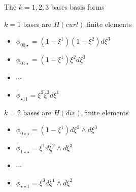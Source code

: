 \documentclass[aspectratio=169]{beamer}
\begin{document}
\begin{frame}[fragile]{The $k = 1, 2, 3$ bases basis forms}

\begin{block}{$k = 1$ bases are $H(curl)$ finite elements}
\begin{itemize}
\item $\phi_{00\star} = (1-\xi^1)(1-\xi^2) d\xi^3$
\item $\phi_{01\star} = (1-\xi^1) \xi^2 d\xi^3$
\item $\cdots$
\item $\phi_{\star11} = \xi^2 \xi^3 d\xi^1$
\end{itemize} 
 \end{block}
\begin{block}{$k = 2$ bases are $H(div)$ finite elements}
\begin{itemize}
\item $\phi_{0\star\star} = (1-\xi^1) d\xi^2 \wedge d\xi^3$
\item $\phi_{1\star\star} = \xi^1 d\xi^2 \wedge d\xi^3$
\item $\cdots$
\item $\phi_{\star\star1} = \xi^3 d\xi^1 \wedge d \xi^2 $
\end{itemize}
\end{block}
\end{frame}
\end{document}
